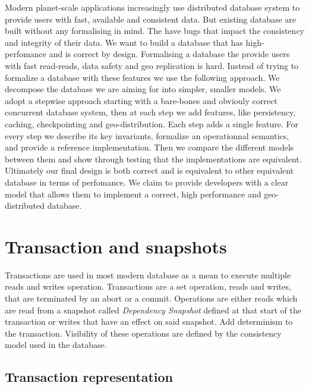 \documentclass[systeme]{compas2022}
\begin{document}
Modern planet-scale applications increasingly use distributed database system to provide users with fast, available and consistent data.
But existing database are built without any formalising in mind.
The have bugs that impact the consistency and integrity of their data.
We want to build a database that has high-perfomance and is correct by design.
Formalising a database the provide users with fast read-reads, data safety and geo replication is hard.
Instead of trying to formalize a database with these features we use the following approach.
We decompose the database we are aiming for into simpler, smaller models.
We adopt a stepwise approach starting with a bare-bones and obviouly correct concurrent database system, then at each step we add features, like persistency, caching, checkpointing and geo-distribution. 
Each step adds a single feature.
For every step we describe its key invariants, formalize an operationnal semantics, and provide a reference implementation.
Then we compare the different models between them and show through testing that the implementations are equivalent.
Ultimately our final design is both correct and is equivalent to other equivalent database in terms of perfomance.
We claim to provide developers with a clear model that allows them to implement a correct, high performance and geo-distributed database.


\section{Transaction and snapshots}


Transactions are used in most modern database as a mean to execute multiple reads and writes operation.
Transactions are a set operation, reads and writes, that are terminated by an abort or a commit.
Operations are either reads which are read from a snapshot called \emph{Dependency Snapshot} defined at that start of the transaction or writes that have an effect on said snapshot. Add determinism to the transaction.
Visibility of these operations are defined by the consistency model used in the database.


\subsection{Transaction representation}
\end{document}
